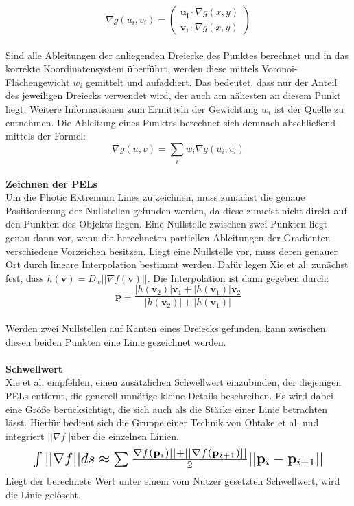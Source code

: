 \documentclass{paperStyle}
\begin{document}
\begin{equation}
\nabla g(u_{i},v_{i}) = \left(\begin{array}{c}\mathbf{u_{i}} \cdot \nabla g(x,y) \\ \mathbf{v_{i}} \cdot \nabla g(x,y)\end{array}\right)
\label{guivui}
\end{equation}
\\
Sind alle Ableitungen der anliegenden Dreiecke des Punktes berechnet und in das korrekte Koordinatensystem überführt, werden diese mittels Voronoi-Flächengewicht $w_{i}$ gemittelt und aufaddiert. Das bedeutet, dass nur der Anteil des jeweiligen Dreiecks verwendet wird, der auch am nähesten an diesem Punkt liegt. Weitere Informationen zum Ermitteln der Gewichtung $w_{i}$ ist der Quelle \cite{Voronoi} zu entnehmen.
Die Ableitung eines Punktes berechnet sich demnach abschließend mittels der Formel:
 \begin{equation}
\nabla g(u,v) = \sum_{i} w_{i} \nabla g(u_{i},v_{i})
\label{guvl}
\end{equation}
\\
\textbf{Zeichnen der PELs}\\
Um die Photic Extremum Lines zu zeichnen, muss zunächst die genaue Positionierung der Nullstellen gefunden werden, da diese zumeist nicht direkt auf den Punkten des Objekts liegen. Eine Nullstelle zwischen zwei Punkten liegt genau dann vor, wenn die berechneten partiellen Ableitungen der Gradienten verschiedene Vorzeichen besitzen. Liegt eine Nullstelle vor, muss deren genauer Ort durch lineare Interpolation bestimmt werden. Dafür legen Xie et al. zunächst fest, dass $h(\mathbf{v}) = D_{w}|| \nabla f(\mathbf{v})||$. Die Interpolation ist dann gegeben durch:
\begin{equation}
\mathbf{p} = \frac{|h(\mathbf{v}_{2})|\mathbf{v}_{1}+|h(\mathbf{v}_{1})|\mathbf{v}_{2}}{|h(\mathbf{v}_{2})|+|h(\mathbf{v}_{1})|}
\end{equation}
\\
Werden zwei Nullstellen auf Kanten eines Dreiecks gefunden, kann zwischen diesen beiden Punkten eine Linie gezeichnet werden.
\\\\
\textbf{Schwellwert}\\
Xie et al. empfehlen, einen zusätzlichen Schwellwert einzubinden, der diejenigen PELs entfernt, die generell unnötige kleine Details beschreiben. Es wird dabei eine Größe berücksichtigt, die sich auch als die Stärke einer Linie betrachten lässt. Hierfür bedient sich die Gruppe einer Technik von Ohtake et al. \cite{Ohtake} und integriert $|| \nabla f ||$über die einzelnen Linien.
\begin{equation}
\resizebox{.88\hsize}{!}{$\int{} || \nabla f ||ds \approx \sum \frac{ \nabla f(\mathbf{p}_{i})|| + || \nabla f(\mathbf{p}_{i+1})||}{2}||\mathbf{p}_{i} - \mathbf{p}_{i+1}||$}
\end{equation}
Liegt der berechnete Wert unter einem vom Nutzer gesetzten Schwellwert, wird die Linie gelöscht.
\end{document}

